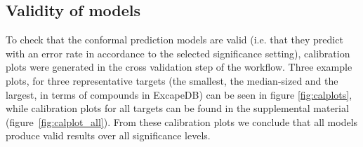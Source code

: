\documentclass[utf8]{frontiersSCNS} %
\begin{document}
\subsection*{Validity of models}
To check that the conformal prediction models are valid (i.e. that they predict with
an error rate in accordance to the selected significance setting), calibration plots
were generated in the cross validation step of the workflow. Three example
plots, for three representative targets (the smallest, the median-sized and the
largest, in terms of compounds in ExcapeDB) can be seen in figure
\ref{fig:calplots}, while calibration plots for all targets can be
found in the supplemental material (figure~\ref{fig:calplot_all}).
From these calibration plots we conclude that all models produce valid results over all
significance levels.
\end{document}
